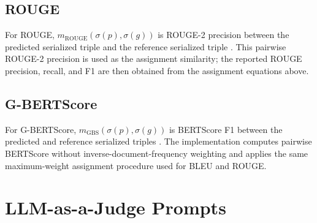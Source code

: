 \documentclass[preprint,12pt]{elsarticle}
\begin{document}
\subsection{ROUGE}
For ROUGE, $m_{\mathrm{ROUGE}}(\sigma(p),\sigma(g))$ is ROUGE-2 precision between the predicted serialized triple and the reference serialized triple \citep{rouge}. This pairwise ROUGE-2 precision is used as the assignment similarity; the reported ROUGE precision, recall, and F1 are then obtained from the assignment equations above.

\subsection{G-BERTScore}
For G-BERTScore, $m_{\mathrm{GBS}}(\sigma(p),\sigma(g))$ is BERTScore F1 between the predicted and reference serialized triples \citep{bertscore}. The implementation computes pairwise BERTScore without inverse-document-frequency weighting and applies the same maximum-weight assignment procedure used for BLEU and ROUGE.

\section{LLM-as-a-Judge Prompts}\label{app:judge_prompts}
\end{document}
